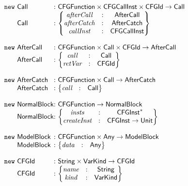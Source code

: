 \[\begin{array}{@{~}r@{~}l@{}l@{~}l}
\new & \Call & : & \CFGFunction \times \CFGCallInst \times \CFGId \rightarrow \Call \\
& \Call & : &
\begin{Bmatrix}
\emph{afterCall} & : & \AfterCall\\
\emph{afterCatch} & : & \AfterCatch\\
\emph{callInst} & : & \CFGCallInst\\
\end{Bmatrix}\\
&&&\\

\new & \AfterCall & : & \CFGFunction \times \Call \times \CFGId \rightarrow \AfterCall \\
& \AfterCall & : &
\begin{Bmatrix}
\emph{call} & : & \Call \\
\emph{retVar} & : & \CFGId \\
\end{Bmatrix}\\
&&&\\

\new & \AfterCatch & : & \CFGFunction \times \Call \rightarrow \AfterCatch \\
& \AfterCatch & : &
\begin{Bmatrix}
\emph{call} & : & \Call \\
\end{Bmatrix}\\
&&&\\

\new & \NormalBlock & : & \CFGFunction \rightarrow \NormalBlock\\
& \NormalBlock & : &
\begin{Bmatrix}
\emph{insts} & : & \CFGInst^{*} \\
\emph{createInst} & : & \CFGInst \rightarrow \Unit \\
\end{Bmatrix}\\
&&&\\

\new & \ModelBlock & : & \CFGFunction \times \Any \rightarrow \ModelBlock\\
& \ModelBlock & : &
\begin{Bmatrix}
\emph{data} & : & \Any \\
\end{Bmatrix}\\
&&& \\

\new & \CFGId & : & \String \times \VarKind \rightarrow \CFGId\\
& \CFGId & : &
\begin{Bmatrix}
\emph{name} & : & \String\\
\emph{kind} & : & \VarKind\\
\end{Bmatrix}\\
\end{array}
\]
\newpage


